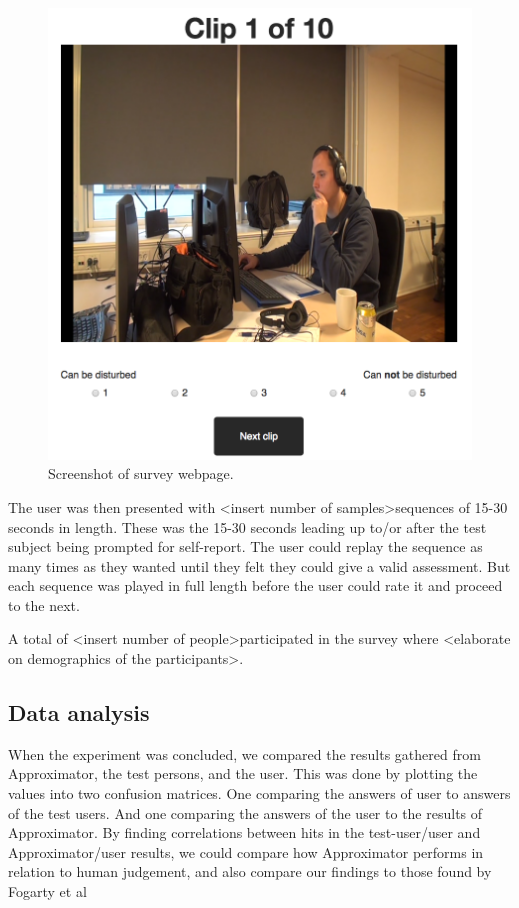 \documentclass{sigchi}
\begin{document}
\begin{figure}
  \centering
  \includegraphics[width=\columnwidth]{figures/webpage_screenshot.png}
  \caption{Screenshot of survey webpage.}
  \label{fig:webpage}
\end{figure}

The user was then presented with \textless insert number of samples\textgreater sequences of 15-30 seconds in length.
These was the 15-30 seconds leading up to/or after the test subject being prompted for self-report.
The user could replay the sequence as many times as they wanted until they felt they could give a valid assessment.
But each sequence was played in full length before the user could rate it and proceed to the next.

A total of \textless insert number of people\textgreater participated in the survey where \textless elaborate on demographics of the participants\textgreater.

\subsection{Data analysis}
When the experiment was concluded, we compared the results gathered from Approximator, the test persons, and the user.
This was done by plotting the values into two confusion matrices.
One comparing the answers of user to answers of the test users.
And one comparing the answers of the user to the results of Approximator.
By finding correlations between hits in the test-user/user and Approximator/user results, we could compare how Approximator performs in relation to human judgement, and also compare our findings to those found by Fogarty et al \cite{fogarty2005predicting}
\end{document}
